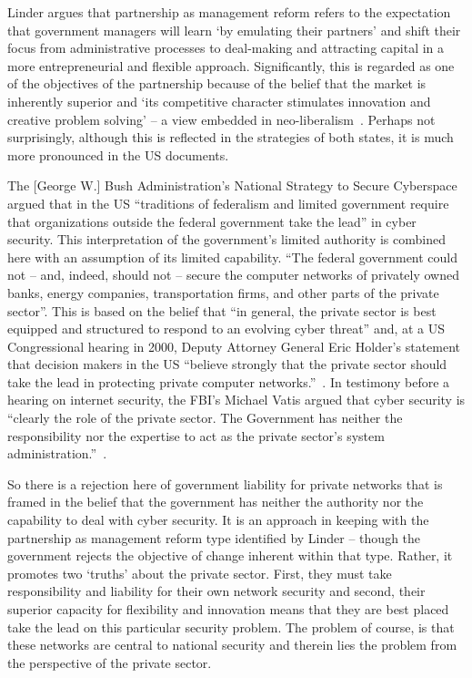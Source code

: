 \documentclass[a4paper,11pt]{article}
\begin{document}
Linder argues that partnership as management reform refers to the
expectation that government managers will learn `by emulating their
partners' and shift their focus from administrative processes to
deal-making and attracting capital in a more entrepreneurial and
flexible approach. Significantly, this is regarded as one of the
objectives of the partnership because of the belief that the market is
inherently superior and `its competitive character stimulates
innovation and creative problem solving' -- a view embedded in
neo-liberalism~\cite{linder:1999}. Perhaps not surprisingly, although
this is reflected in the strategies of both states, it is much more
pronounced in the US documents.

The [George W.] Bush Administration's National Strategy to Secure
Cyberspace~\cite{gwbush:2003} argued that in the US ``traditions of
federalism and limited government require that organizations outside
the federal government take the lead'' in cyber security.  This
interpretation of the government's limited authority is combined here
with an assumption of its limited capability. ``The federal government
could not -- and, indeed, should not -- secure the computer networks
of privately owned banks, energy companies, transportation firms, and
other parts of the private sector''. This is based on the belief that
``in general, the private sector is best equipped and structured to
respond to an evolving cyber threat'' and, at a US Congressional
hearing in 2000, Deputy Attorney General Eric Holder's statement that
decision makers in the US ``believe strongly that the private sector
should take the lead in protecting private computer
networks.''~\cite{holder:2000}. In testimony before a hearing on
internet security, the FBI's Michael Vatis argued that cyber security
is ``clearly the role of the private sector. The Government has
neither the responsibility nor the expertise to act as the private
sector's system administration.''~\cite{vatis:2000}.

So there is a rejection here of government liability for private
networks that is framed in the belief that the government has neither
the authority nor the capability to deal with cyber security. It is an
approach in keeping with the partnership as management reform type
identified by Linder -- though the government rejects the objective of
change inherent within that type. Rather, it promotes two `truths'
about the private sector. First, they must take responsibility and
liability for their own network security and second, their superior
capacity for flexibility and innovation means that they are best
placed take the lead on this particular security problem. The problem
of course, is that these networks are central to national security and
therein lies the problem from the perspective of the private sector.
\end{document}
